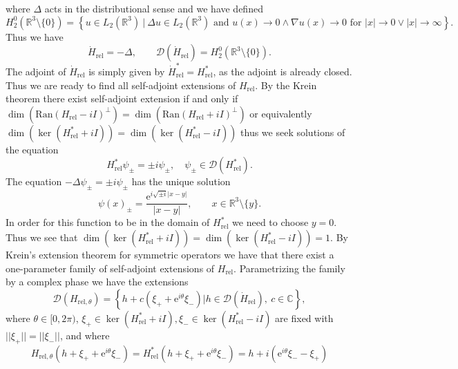 \documentclass[a4paper,11pt]{article}
\newcommand{\euler}[1]{\text{e}^{#1}}
\newcommand{\dom}[1]{\mathscr D\left(#1\right)}
\newcommand{\Ran}[1]{\text{Ran}\left(#1\right)}
\newcommand{\R}{\mathbb{R}}
\newcommand{\C}{\mathbb{C}}
\begin{document}
where $ \Delta $ acts in the distributional sense and we have defined\begin{equation}
H_2^0(\R^3\setminus\{0\})=\left\{u\in L_2(\R^3)\ \big\rvert\ \Delta u\in L_2(\R^3)\text{ and } u(x)\to0\wedge\nabla u(x)\to0 \text{ for } |x|\to0\vee |x|\to\infty\right\}.
\end{equation} Thus we have \begin{equation}
\dot{H}_{\text{rel}}=-\Delta,\qquad \dom{\dot{H}_{\text{rel}}}=H^0_2(\R^3\setminus\{0\}).
\end{equation}
The adjoint of $ \dot{H}_{\text{rel}} $ is simply given by $ \dot{H}_{\text{rel}}^*=H_{\text{rel}}^* $, as the adjoint is already closed. Thus we are ready to find all self-adjoint extensions of $ H_{\text{rel}} $. By the Krein theorem there exist self-adjoint extension if and only if $ \dim\left(\Ran{H_{\text{rel}}-iI}^\perp\right)=\dim\left(\Ran{H_{\text{rel}}+iI}^\perp\right) $ or equivalently $ \dim\left(\ker{\left(H^*_{\text{rel}}+iI\right)}\right)=\dim\left(\ker{\left(H^*_{\text{rel}}-iI\right)}\right) $ thus we seek solutions of the equation \begin{equation}
H_{\text{rel}}^*\psi_\pm=\pm i \psi_\pm,\quad \psi_\pm\in\dom{H_{\text{rel}}^*}.
\end{equation}
The equation $ -\Delta \psi_\pm=\pm i \psi_\pm $ has the unique solution \begin{equation}
\psi(x)_\pm=\frac{\euler{ i\sqrt{\pm i}|x-y|}}{|x-y|},\qquad x\in\R^3\setminus\{y\}.
\end{equation}
In order for this function to be in the domain of $ H_{\text{rel}}^*$ we need to choose $ y=0 $.
Thus we see that $ \dim\left(\ker{\left(H^*_{\text{rel}}+iI\right)}\right)=\dim\left(\ker{\left(H^*_{\text{rel}}-iI\right)}\right)=1 $. By Krein's extension theorem for symmetric operators we have that there exist a one-parameter family of self-adjoint extensions of $ H_{\text{rel}} $. Parametrizing the family by a complex phase we have the extensions \begin{equation}
\dom{H_{\text{rel},\theta}}=\left\{ h+c(\xi_++\euler{i\theta}\xi_-)\Big\rvert h\in\dom{\dot{H}_{\text{rel}}},\ c\in\C \right\},
\end{equation}
where $ \theta\in[0,2\pi) $, $ \xi_+\in \ker\left(H_{\text{rel}}^*+iI\right),\xi_-\in \ker\left(H_{\text{rel}}^*-iI\right) $ are fixed with $ ||\xi_+||=||\xi_-|| $, and where \begin{equation}
H_{\text{rel},\theta}(h+\xi_++\euler{i\theta}\xi_-)=H_{\text{rel}}^*(h+\xi_++\euler{i\theta}\xi_-)=h+i(\euler{i\theta}\xi_--\xi_+)
\end{equation}
\end{document}
